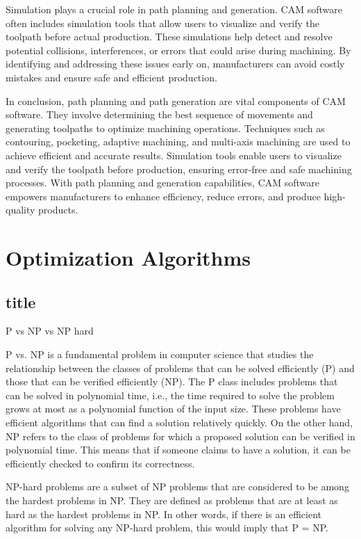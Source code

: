 Simulation plays a crucial role in path planning and generation. CAM software often includes simulation tools that allow users to visualize and verify the toolpath before actual production. These simulations help detect and resolve potential collisions, interferences, or errors that could arise during machining. By identifying and addressing these issues early on, manufacturers can avoid costly mistakes and ensure safe and efficient production.

In conclusion, path planning and path generation are vital components of CAM software. They involve determining the best sequence of movements and generating toolpaths to optimize machining operations. Techniques such as contouring, pocketing, adaptive machining, and multi-axis machining are used to achieve efficient and accurate results. Simulation tools enable users to visualize and verify the toolpath before production, ensuring error-free and safe machining processes. With path planning and generation capabilities, CAM software empowers manufacturers to enhance efficiency, reduce errors, and produce high-quality products.
\section{Optimization Algorithms}%

\subsection{title}
P vs NP vs NP hard

P vs. NP is a fundamental problem in computer science that studies the relationship between the classes of problems that can be solved efficiently (P) and those that can be verified efficiently (NP). The P class includes problems that can be solved in polynomial time, i.e., the time required to solve the problem grows at most as a polynomial function of the input size. These problems have efficient algorithms that can find a solution relatively quickly. On the other hand, NP refers to the class of problems for which a proposed solution can be verified in polynomial time. This means that if someone claims to have a solution, it can be efficiently checked to confirm its correctness.

NP-hard problems are a subset of NP problems that are considered to be among the hardest problems in NP. They are defined as problems that are at least as hard as the hardest problems in NP. In other words, if there is an efficient algorithm for solving any NP-hard problem, this would imply that P = NP.

